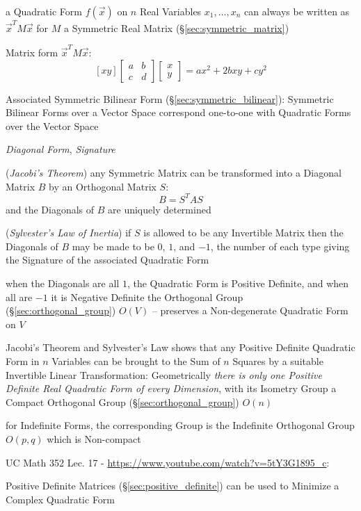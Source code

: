 a Quadratic Form $f(\vec{x})$ on $n$ Real Variables $x_1,\ldots,x_n$ can always
be written as $\vec{x}^T M \vec{x}$ for $M$ a Symmetric Real Matrix
(\S\ref{sec:symmetric_matrix})

Matrix form $\vec{x}^T M \vec{x}$:
\[
  [x y]
  \begin{bmatrix}
    a & b \\
    c & d
  \end{bmatrix}
  \begin{bmatrix}
    x \\
    y
  \end{bmatrix}
  = ax^2 + 2bxy + cy^2
\]

Associated Symmetric Bilinear Form (\S\ref{sec:symmetric_bilinear}): Symmetric
Bilinear Forms over a Vector Space correspond one-to-one with Quadratic Forms
over the Vector Space

\emph{Diagonal Form}, \emph{Signature}

(\emph{Jacobi's Theorem}) any Symmetric Matrix can be transformed into a
Diagonal Matrix $B$ by an Orthogonal Matrix $S$:
\[
  B = S^T A S
\]
and the Diagonals of $B$ are uniquely determined

(\emph{Sylvester's Law of Inertia}) if $S$ is allowed to be any Invertible
Matrix then the Diagonals of $B$ may be made to be $0$, $1$, and $-1$, the
number of each type giving the Signature of the associated Quadratic Form

when the Diagonals are all $1$, the Quadratic Form is Positive Definite, and
when all are $-1$ it is Negative Definite
the Orthogonal Group (\S\ref{sec:orthogonal_group}) $O(V)$ -- preserves a
Non-degenerate Quadratic Form on $V$

Jacobi's Theorem and Sylvester's Law shows that any Positive Definite Quadratic
Form in $n$ Variables can be brought to the Sum of $n$ Squares by a suitable
Invertible Linear Transformation: Geometrically \emph{there is only one
  Positive Definite Real Quadratic Form of every Dimension}, with its Isometry
Group a Compact Orthogonal Group (\S\ref{sec:orthogonal_group}) $O(n)$

for Indefinite Forms, the corresponding Group is the Indefinite Orthogonal
Group $O(p,q)$ which is Non-compact


UC Math 352 Lec. 17 - \url{https://www.youtube.com/watch?v=5tY3G1895_c}:

Positive Definite Matrices (\S\ref{sec:positive_definite}) can be used to
Minimize a Complex Quadratic Form



